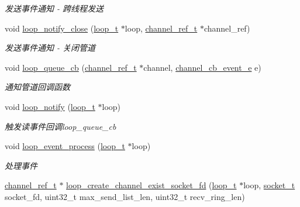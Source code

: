\begin{DoxyCompactItemize}
\begin{DoxyCompactList}\small\item\em 发送事件通知 -\/ 跨线程发送 \end{DoxyCompactList}\item 
void \hyperlink{a00068_a6c9f3ec8e93c6e7b10ebb4dcaca562d4_a6c9f3ec8e93c6e7b10ebb4dcaca562d4}{loop\+\_\+notify\+\_\+close} (\hyperlink{a00050_a9c3ad1cd2de83e09f3a7b59fa82c94ee_a9c3ad1cd2de83e09f3a7b59fa82c94ee}{loop\+\_\+t} $\ast$loop, \hyperlink{a00050_a151271c9d188ef28d4d24bb81dcc1263_a151271c9d188ef28d4d24bb81dcc1263}{channel\+\_\+ref\+\_\+t} $\ast$channel\+\_\+ref)
\begin{DoxyCompactList}\small\item\em 发送事件通知 -\/ 关闭管道 \end{DoxyCompactList}\item 
void \hyperlink{a00068_a970d2bf2e65270fe3d93de1e22a4d34c_a970d2bf2e65270fe3d93de1e22a4d34c}{loop\+\_\+queue\+\_\+cb} (\hyperlink{a00050_a151271c9d188ef28d4d24bb81dcc1263_a151271c9d188ef28d4d24bb81dcc1263}{channel\+\_\+ref\+\_\+t} $\ast$channel, \hyperlink{a00050_aaf2cba5d4035f3d56350b59342ebf65c_aaf2cba5d4035f3d56350b59342ebf65c}{channel\+\_\+cb\+\_\+event\+\_\+e} e)
\begin{DoxyCompactList}\small\item\em 通知管道回调函数 \end{DoxyCompactList}\item 
void \hyperlink{a00068_a3857990b0f1f9e27e000b5924b88a958_a3857990b0f1f9e27e000b5924b88a958}{loop\+\_\+notify} (\hyperlink{a00050_a9c3ad1cd2de83e09f3a7b59fa82c94ee_a9c3ad1cd2de83e09f3a7b59fa82c94ee}{loop\+\_\+t} $\ast$loop)
\begin{DoxyCompactList}\small\item\em 触发读事件回调loop\+\_\+queue\+\_\+cb \end{DoxyCompactList}\item 
void \hyperlink{a00068_a94a2dfa4ba7723d7face3f76ebf31e54_a94a2dfa4ba7723d7face3f76ebf31e54}{loop\+\_\+event\+\_\+process} (\hyperlink{a00050_a9c3ad1cd2de83e09f3a7b59fa82c94ee_a9c3ad1cd2de83e09f3a7b59fa82c94ee}{loop\+\_\+t} $\ast$loop)
\begin{DoxyCompactList}\small\item\em 处理事件 \end{DoxyCompactList}\item 
\hyperlink{a00050_a151271c9d188ef28d4d24bb81dcc1263_a151271c9d188ef28d4d24bb81dcc1263}{channel\+\_\+ref\+\_\+t} $\ast$ \hyperlink{a00104_ga6879ac453ef83768ce8f8ef43a474409_ga6879ac453ef83768ce8f8ef43a474409}{loop\+\_\+create\+\_\+channel\+\_\+exist\+\_\+socket\+\_\+fd} (\hyperlink{a00050_a9c3ad1cd2de83e09f3a7b59fa82c94ee_a9c3ad1cd2de83e09f3a7b59fa82c94ee}{loop\+\_\+t} $\ast$loop, \hyperlink{a00050_a0d9e0afbf02fb6ed6c5b1415dce51b05_a0d9e0afbf02fb6ed6c5b1415dce51b05}{socket\+\_\+t} socket\+\_\+fd, uint32\+\_\+t max\+\_\+send\+\_\+list\+\_\+len, uint32\+\_\+t recv\+\_\+ring\+\_\+len)

\end{DoxyCompactItemize}

